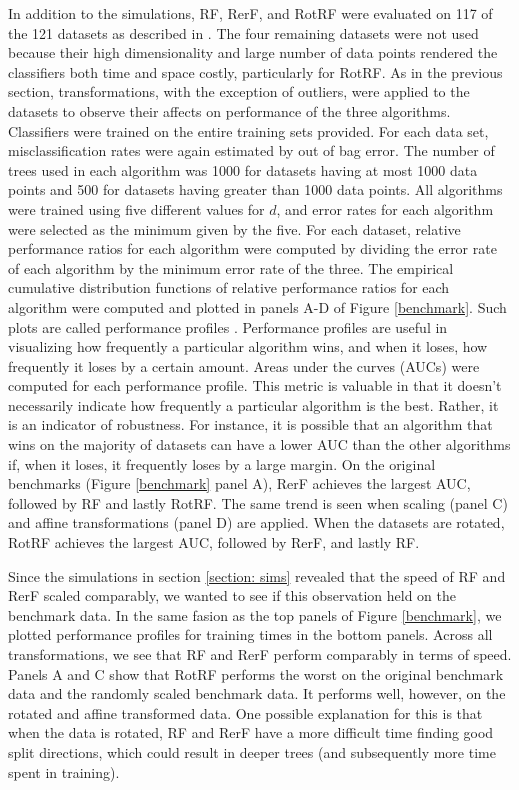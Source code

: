 \documentclass{article}
\begin{document}
In addition to the simulations, RF, RerF, and RotRF were evaluated on 117 of the 121 datasets as described in \cite{Delgado2014}. The four remaining datasets were not used because their high dimensionality and large number of data points rendered the classifiers both time and space costly, particularly for RotRF. As in the previous section, transformations, with the exception of outliers, were applied to the datasets to observe their affects on performance of the three algorithms. Classifiers were trained on the entire training sets provided. For each data set, misclassification rates were again estimated by out of bag error. The number of trees used in each algorithm was 1000 for datasets having at most 1000 data points and 500 for datasets having greater than 1000 data points. All algorithms were trained using five different values for $d$, and error rates for each algorithm were selected as the minimum given by the five. For each dataset, relative performance ratios for each algorithm were computed by dividing the error rate of each algorithm by the minimum error rate of the three. The empirical cumulative distribution functions of relative performance ratios for each algorithm were computed and plotted in panels A-D of Figure \ref{benchmark}. Such plots are called performance profiles \cite{Dolan2002}. Performance profiles are useful in visualizing how frequently a particular algorithm wins, and when it loses, how frequently it loses by a certain amount. Areas under the curves (AUCs) were computed for each performance profile. This metric is valuable in that it doesn't necessarily indicate how frequently a particular algorithm is the best. Rather, it is an indicator of robustness. For instance, it is possible that an algorithm that wins on the majority of datasets can have a lower AUC than the other algorithms if, when it loses, it frequently loses by a large margin. On the original benchmarks (Figure \ref{benchmark} panel A), RerF achieves the largest AUC, followed by RF and lastly RotRF. The same trend is seen when scaling (panel C) and affine transformations (panel D) are applied. When the datasets are rotated, RotRF achieves the largest AUC, followed by RerF, and lastly RF.

Since the simulations in section \ref{section: sims} revealed that the speed of RF and RerF scaled comparably, we wanted to see if this observation held on the benchmark data. In the same fasion as the top panels of Figure \ref{benchmark}, we plotted performance profiles for training times in the bottom panels. Across all transformations, we see that RF and RerF perform comparably in terms of speed. Panels A and C show that RotRF performs the worst on the original benchmark data and the randomly scaled benchmark data. It performs well, however, on the rotated and affine transformed data. One possible explanation for this is that when the data is rotated, RF and RerF have a more difficult time finding good split directions, which could result in deeper trees (and subsequently more time spent in training).  
\end{document}
